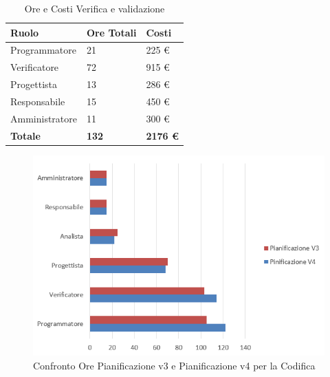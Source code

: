\documentclass[a4paper,11pt]{article}
\begin{document}
		\begin{table}[h!]			
		\begin{center}
			\begin{tabular}{l l l}
			\textbf{Ruolo} & \textbf{Ore Totali} & \textbf{Costi}\\
			\midrule
			Programmatore 	& 21 	& 225 	\euro	\\
			Verificatore 	& 72 	& 915	\euro	\\
			Progettista 	& 13 	& 286	\euro	\\		
			Responsabile 	& 15 	& 450 	\euro	\\
			Amministratore 	& 11 	& 300 	\euro	\\
			\midrule
			\textbf{Totale} & \textbf{132} & \textbf{ 2176 \euro}\\
			\end{tabular}
		\end{center}
		\caption{Ore e Costi Verifica e validazione}
		\end{table}
		\clearpage
		
		\begin{figure}[h!]
		    \centering
			\includegraphics[scale=0.7]{../Images/chart-Confronto_Progettazione3vs4_Codifica.png}
			\caption{Confronto Ore Pianificazione v3 e Pianificazione v4 per la Codifica}
		\end{figure}		
		
\end{document}
